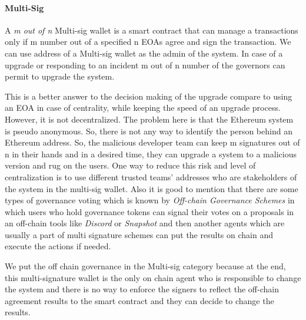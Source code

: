 \paragraph{Multi-Sig}
A \textit{m out of n} Multi-sig wallet is a smart contract that can manage a transactions only if m number out of a specified n EOAs agree and sign the transaction. We can use address of a Multi-sig wallet as the admin of the system. In case of a upgrade or responding to an incident m out of n number of the governors can permit to upgrade the system.

This is a better answer to the decision making of the upgrade compare to using an EOA in case of centrality, while keeping the speed of an upgrade process. However, it is not decentralized. The problem here is that the Ethereum system is pseudo anonymous. So, there is not any way to identify the person behind an Ethereum address. So, the malicious developer team can keep m signatures out of n in their hands and in a desired time, they can upgrade a system to a malicious version and rug on the users.
One way to reduce this risk and level of centralization is to use different trusted teams' addresses who are stakeholders of the system in the multi-sig wallet.
Also it is good to mention that there are some types of governance voting which is known by \textit{Off-chain Governance Schemes} in which users who hold governance tokens can signal their votes on a proposals in an off-chain tools like \textit{Discord} or \textit{Snapshot} and then another agents which are usually a part of multi signature schemes can put the results on chain and execute the actions if needed.

We put the off chain governance in the Multi-sig category because at the end, this multi-signature wallet is the only on chain agent who is responsible to change the system and there is no way to enforce the signers to reflect the off-chain agreement results to the smart contract and they can decide to change the results.

